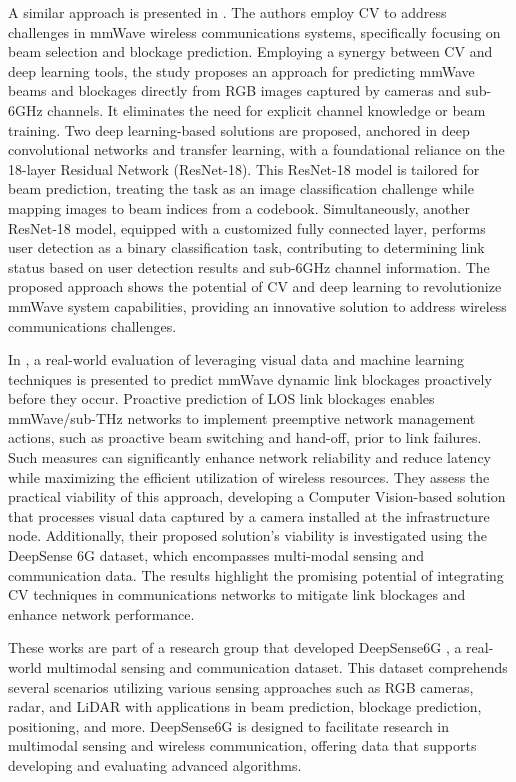 A similar approach is presented in \cite{Block_predict2}. The authors employ CV to address challenges in mmWave wireless communications systems, specifically focusing on beam selection and blockage prediction. Employing a synergy between CV and deep learning tools, the study proposes an approach for predicting mmWave beams and blockages directly from RGB images captured by cameras and sub-6GHz channels. It eliminates the need for explicit channel knowledge or beam training. Two deep learning-based solutions are proposed, anchored in deep convolutional networks and transfer learning, with a foundational reliance on the 18-layer Residual Network (ResNet-18). This ResNet-18 model is tailored for beam prediction, treating the task as an image classification challenge while mapping images to beam indices from a codebook. Simultaneously, another ResNet-18 model, equipped with a customized fully connected layer, performs user detection as a binary classification task, contributing to determining link status based on user detection results and sub-6GHz channel information. The proposed approach shows the potential of CV and deep learning to revolutionize mmWave system capabilities, providing an innovative solution to address wireless communications challenges.

In \cite{CVAided}, a real-world evaluation of leveraging visual data and machine learning techniques is presented to predict mmWave dynamic link blockages proactively before they occur. Proactive prediction of LOS link blockages enables mmWave/sub-THz networks to implement preemptive network management actions, such as proactive beam switching and hand-off, prior to link failures. Such measures can significantly enhance network reliability and reduce latency while maximizing the efficient utilization of wireless resources. They assess the practical viability of this approach, developing a Computer Vision-based solution that processes visual data captured by a camera installed at the infrastructure node. Additionally, their proposed solution's viability is investigated using the DeepSense 6G \cite{deepsense} dataset, which encompasses multi-modal sensing and communication data. The results highlight the promising potential of integrating CV techniques in communications networks to mitigate link blockages and enhance network performance.


These works are part of a research group that developed DeepSense6G \cite{deepsense}, a real-world multimodal sensing and communication dataset. This dataset comprehends several scenarios utilizing various sensing approaches such as RGB cameras, radar, and LiDAR with applications in beam prediction, blockage prediction, positioning, and more. DeepSense6G is designed to facilitate research in multimodal sensing and wireless communication, offering data that supports developing and evaluating advanced algorithms.


